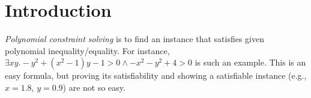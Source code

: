 \documentclass[runningheads,a4paper,oribibl]{llncs}
\begin{document}
%

\section{Introduction}
{\em Polynomial constraint solving} is to find an instance 
that satisfies given polynomial inequality/equality. 
For instance, $\exists x y. -y^2 + (x^2 - 1) y - 1 > 0 \wedge -x^2 - y^2 + 4 > 0$ is 
such an example. This is an easy formula, but proving its satisfiability and showing a satisfiable instance (e.g., $x = 1.8$, $y=0.9$) are not so easy.  
\end{document}
